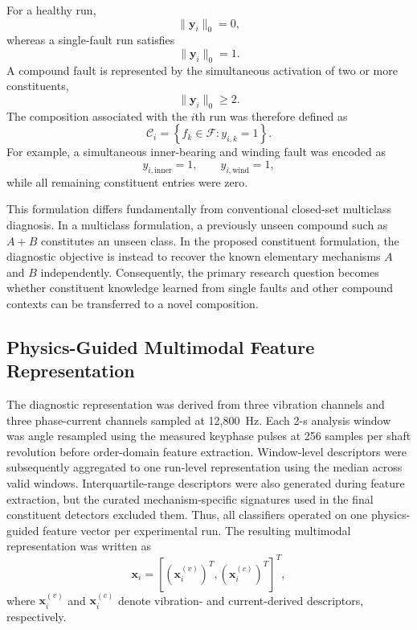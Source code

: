 For a healthy run,
\begin{equation}
\lVert \mathbf{y}_i \rVert_0 = 0,
\end{equation}
whereas a single-fault run satisfies
\begin{equation}
\lVert \mathbf{y}_i \rVert_0 = 1.
\end{equation}
A compound fault is represented by the simultaneous activation of two or
more constituents,
\begin{equation}
\lVert \mathbf{y}_i \rVert_0 \geq 2.
\end{equation}
The composition associated with the $i$th run was therefore defined as
\begin{equation}
\mathcal{C}_i = \left\{ f_k \in \mathcal{F} : y_{i,k} = 1 \right\}.
\end{equation}
For example, a simultaneous inner-bearing and winding fault was encoded as
\begin{equation}
y_{i,\mathrm{inner}} = 1, \qquad y_{i,\mathrm{wind}} = 1,
\end{equation}
while all remaining constituent entries were zero.

This formulation differs fundamentally from conventional closed-set
multiclass diagnosis. In a multiclass formulation, a previously unseen
compound such as $A{+}B$ constitutes an unseen class. In the proposed
constituent formulation, the diagnostic objective is instead to recover the
known elementary mechanisms $A$ and $B$ independently. Consequently, the
primary research question becomes whether constituent knowledge learned
from single faults and other compound contexts can be transferred to a
novel composition.

\subsection{Physics-Guided Multimodal Feature Representation}
\label{sec:features}

The diagnostic representation was derived from three vibration channels and
three phase-current channels sampled at 12{,}800~Hz. Each 2-s analysis
window was angle resampled using the measured keyphase pulses at 256
samples per shaft revolution before order-domain feature extraction.
Window-level descriptors were subsequently aggregated to one run-level
representation using the median across valid windows. Interquartile-range
descriptors were also generated during feature extraction, but the curated
mechanism-specific signatures used in the final constituent detectors
excluded them. Thus, all classifiers operated on one physics-guided feature
vector per experimental run. The resulting multimodal representation was
written as
\begin{equation}
\mathbf{x}_i = \left[\left(\mathbf{x}_i^{(v)}\right)^{T},
\left(\mathbf{x}_i^{(c)}\right)^{T}\right]^{T},
\end{equation}
where $\mathbf{x}_i^{(v)}$ and $\mathbf{x}_i^{(c)}$ denote vibration- and
current-derived descriptors, respectively.

